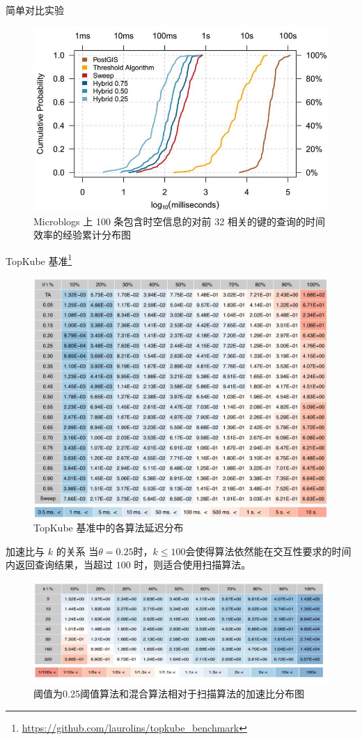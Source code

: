 \documentclass[10pt,aspectratio=169]{beamer}
\begin{document}
\begin{frame}{简单对比实验}
    \begin{figure}
        \includegraphics[width=.5\textwidth]{pic/blog.jpg}
        \caption{Microblogs 上 100 条包含时空信息的对前 32 相关的键的查询的时间效率的经验累计分布图}
    \end{figure}
\end{frame}

\begin{frame}{TopKube 基准\footnote{\url{https://github.com/laurolins/topkube_benchmark}}}
    \begin{figure}
        \includegraphics[width=.4\textwidth]{pic/time-peformance.jpg}
        \caption{TopKube 基准中的各算法延迟分布}
    \end{figure}
\end{frame}

\begin{frame}{加速比与 $k$ 的关系}
    当$\theta = 0.25$时，$k \leq 100$会使得算法依然能在交互性要求的时间内返回查询结果，当超过 $100$ 时，则适合使用扫描算法。

    \begin{figure}
        \includegraphics[width=.5\textwidth]{pic/speedup-to-sweep.png}
        \caption{阈值为0.25阈值算法和混合算法相对于扫描算法的加速比分布图}
    \end{figure}

\end{frame}
\end{document}
